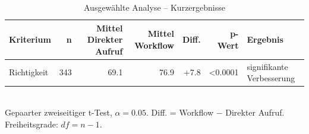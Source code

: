 \begin{table}[htbp]
\centering
\caption{Ausgewählte Analyse -- Kurzergebnisse}
\begin{tabular}{lrrrrrl}
\toprule
Kriterium & n & Mittel Direkter Aufruf & Mittel Workflow & Diff. & p-Wert & Ergebnis \\
\midrule
Richtigkeit & 343 & 69.1 & 76.9 & +7.8 & <0.0001 & signifikante Verbesserung \\
\bottomrule
\end{tabular}
\\[2mm]
\footnotesize Gepaarter zweiseitiger t-Test, $\alpha=0.05$. Diff. = Workflow $-$ Direkter Aufruf. Freiheitsgrade: $df=n-1$.
\end{table}
